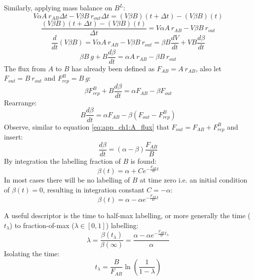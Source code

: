 Similarly, applying mass balance on $B^L$:
\begin{equation}
    V \alpha A\ r_{AB} \Delta t - V \beta B\ r_{out} \Delta t = (V \beta B)(t + \Delta t) - (V \beta B)(t)
\label{eq:app_ch1:B_balance}
\end{equation}
\begin{equation}
    \frac{(V \beta B)(t + \Delta t) - (V \beta B)(t)}{\Delta t} = V \alpha A\ r_{AB} - V \beta B\ r_{out}
\label{eq:app_ch1:B_dq1}
\end{equation}
\begin{equation}
    \frac{d}{dt} (V \beta B) = V \alpha A\ r_{AB} - V \beta B\ r_{out} = \beta B \frac{d V}{dt} + V B \frac{d\beta}{dt}
\label{eq:app_ch1:B_dq2}
\end{equation}
\begin{equation}
    \beta B\ g + B \frac{d\beta}{dt} = \alpha A\ r_{AB} - \beta B\ r_{out}
\label{eq:app_ch1:B_dq2s}
\end{equation}
The flux from $A$ to $B$  has already been defined as $F_{AB} = A\ r_{AB}$, also let $F_{out} = B\ r_{out}$ and $F^B_{rep} = B\ g$:
\begin{equation}
     \beta F^B_{rep} + B \frac{d\beta}{dt} = \alpha F_{AB} - \beta F_{out}
\label{eq:app_ch1:B_dq2s2}
\end{equation}
Rearrange:
\begin{equation}
     B \frac{d\beta}{dt} = \alpha F_{AB} - \beta (F_{out} - F^B_{rep})
\label{eq:app_ch1:B_dq2s3}
\end{equation}
Observe, similar to equation \ref{eq:app_ch1:A_flux} that $F_{out} = F_{AB} + F^B_{rep}$ and insert:
\begin{equation}
     \frac{d\beta}{dt} = (\alpha - \beta) \frac{F_{AB}}{B}
\label{eq:app_ch1:B_dq2s4}
\end{equation}
By integration the labelling fraction of $B$ is found:
\begin{equation}
     \beta(t) = \alpha + C e^{-\frac{F_{AB}}{B} t}
\label{eq:app_ch1:B_t}
\end{equation}
In most cases there will be no labelling of $B$ at time zero i.e. an initial condition of $\beta(t) = 0$, resulting in integration constant $C = -\alpha$:
\begin{equation}
     \beta(t) = \alpha - \alpha e^{-\frac{F_{AB}}{B} t}
\label{eq:app_ch1:B_t_IC}
\end{equation}


A useful descriptor is the time to half-max labelling, or more generally the time ($t_{\lambda}$) to fraction-of-max ($\lambda \in [0, 1]$) labelling:
\begin{equation}
     \lambda = \frac{\beta(t_{\lambda})}{\beta(\infty)} = \frac{\alpha - \alpha e^{-\frac{F_{AB}}{B} t_{\lambda}}}{\alpha}
\label{eq:app_ch1:B_hl}
\end{equation}
Isolating the time:
\begin{equation}
     t_{\lambda} = \frac{B}{F_{AB}} \ln\left( \frac{1}{1 - \lambda} \right)
\label{eq:app_ch1:B_hl2}
\end{equation}

